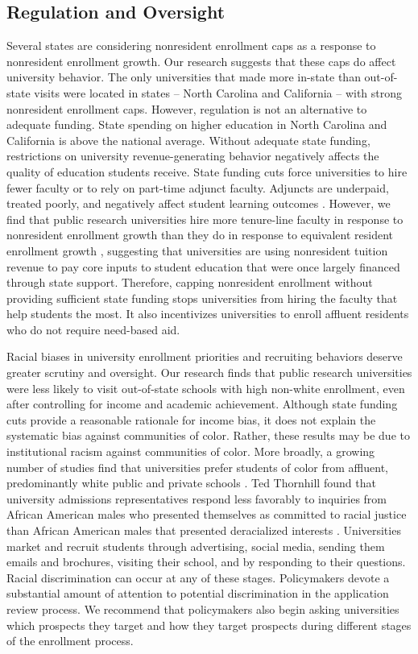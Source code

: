 \documentclass{article}
\begin{document}
\subsection*{Regulation and Oversight}

Several states are considering nonresident enrollment caps as a response to nonresident enrollment growth. Our research suggests that these caps do affect university behavior. The only universities that made more in-state than out-of-state visits were located in states -- North Carolina and California -- with strong nonresident enrollment caps. However, regulation is not an alternative to adequate funding. State spending on higher education in North Carolina and California is above the national average.  Without adequate state funding, restrictions on university revenue-generating behavior negatively affects the quality of education students receive. State funding cuts force universities to hire fewer faculty or to rely on part-time adjunct faculty. Adjuncts are underpaid, treated poorly, and negatively affect student learning outcomes \citep{RN4189}. However, we find that public research universities hire more tenure-line faculty in response to nonresident enrollment growth than they do in response to equivalent resident enrollment growth \citep{RN4492}, suggesting that universities are using nonresident tuition revenue to pay core inputs to student education that were once largely financed through state support. Therefore, capping nonresident enrollment without providing sufficient state funding stops universities from hiring the faculty that help students the most. It also incentivizes universities to enroll affluent residents who do not require need-based aid.


Racial biases in university enrollment priorities and recruiting behaviors deserve greater scrutiny and oversight. Our research finds that public research universities were less likely to visit out-of-state schools with high non-white enrollment, even after controlling for income and academic achievement. Although state funding cuts provide a reasonable rationale for income bias, it does not explain the systematic bias against communities of color. Rather, these results may be due to institutional racism against communities of color. More broadly, a growing number of studies find that universities prefer students of color from affluent, predominantly white public and private schools \citep{RN4495, RN4396, RN2517}. Ted Thornhill found that university admissions representatives respond less favorably to inquiries from African American males who presented themselves as committed to racial justice than African American males that presented deracialized interests \citep{RN4360}. Universities market and recruit students through advertising, social media, sending them emails and brochures, visiting their school, and by responding to their questions. Racial discrimination can occur at any of these stages. Policymakers devote a substantial amount of attention to potential discrimination in the application review process. We recommend that policymakers also begin asking universities which prospects they target and how they target prospects during different stages of the enrollment process.
\end{document}
